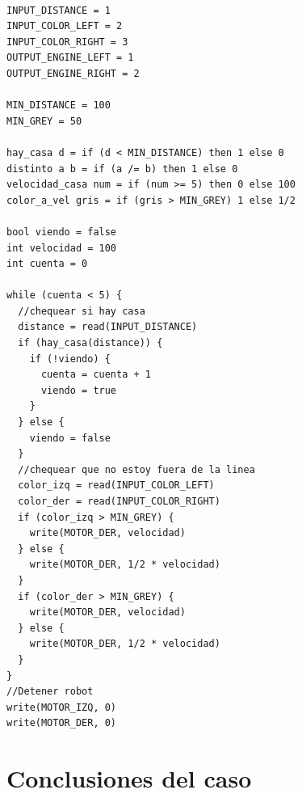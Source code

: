 \begin{verbatim}

INPUT_DISTANCE = 1
INPUT_COLOR_LEFT = 2
INPUT_COLOR_RIGHT = 3
OUTPUT_ENGINE_LEFT = 1
OUTPUT_ENGINE_RIGHT = 2

MIN_DISTANCE = 100
MIN_GREY = 50

hay_casa d = if (d < MIN_DISTANCE) then 1 else 0
distinto a b = if (a /= b) then 1 else 0
velocidad_casa num = if (num >= 5) then 0 else 100
color_a_vel gris = if (gris > MIN_GREY) 1 else 1/2

bool viendo = false
int velocidad = 100
int cuenta = 0

while (cuenta < 5) {
  //chequear si hay casa
  distance = read(INPUT_DISTANCE)
  if (hay_casa(distance)) {
    if (!viendo) {
      cuenta = cuenta + 1
      viendo = true
    }
  } else {
    viendo = false
  }
  //chequear que no estoy fuera de la linea
  color_izq = read(INPUT_COLOR_LEFT)
  color_der = read(INPUT_COLOR_RIGHT)
  if (color_izq > MIN_GREY) {
    write(MOTOR_DER, velocidad)
  } else {
    write(MOTOR_DER, 1/2 * velocidad)
  }
  if (color_der > MIN_GREY) {
    write(MOTOR_DER, velocidad)
  } else {
    write(MOTOR_DER, 1/2 * velocidad)
  }
}
//Detener robot
write(MOTOR_IZQ, 0)
write(MOTOR_DER, 0)

\end{verbatim}


\section {Conclusiones del caso}


